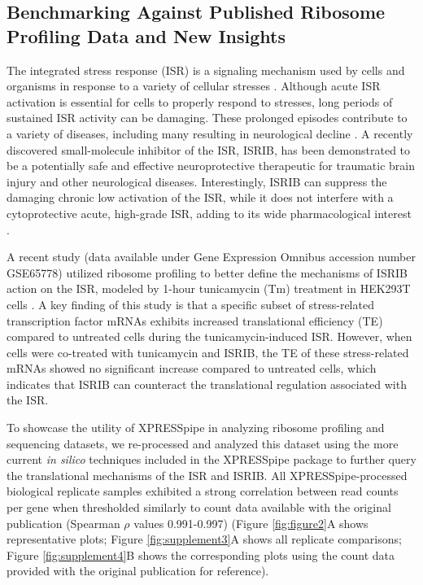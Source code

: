 \documentclass[10pt, oneside]{article}
\begin{document}
\subsection*{Benchmarking Against Published Ribosome Profiling Data and New Insights}
The integrated stress response (ISR) is a signaling mechanism used by cells and organisms in response to a variety of cellular stresses \cite{harding_isr}. Although acute ISR activation is essential for cells to properly respond to stresses, long periods of sustained ISR activity can be damaging. These prolonged episodes contribute to a variety of diseases, including many resulting in neurological decline \cite{isr_disease}. A recently discovered small-molecule inhibitor of the ISR, ISRIB, has been demonstrated to be a potentially safe and effective neuroprotective therapeutic for traumatic brain injury and other neurological diseases. Interestingly, ISRIB can suppress the damaging chronic low activation of the ISR, while it does not interfere with a cytoprotective acute, high-grade ISR, adding to its wide pharmacological interest \cite{isrib_activation, isrib_structure, isrib_riboseq, isrib_neuroprotective, isrib_neuroprotective2, isrib_neuroprotective3, isrib_neuroprotective4}. \par

A recent study (data available under Gene Expression Omnibus accession number GSE65778) utilized ribosome profiling to better define the mechanisms of ISRIB action on the ISR, modeled by 1-hour tunicamycin (Tm) treatment in HEK293T cells \cite{isrib_riboseq}. A key finding of this study is that a specific subset of stress-related transcription factor mRNAs exhibits increased translational efficiency (TE) compared to untreated cells during the tunicamycin-induced ISR. However, when cells were co-treated with tunicamycin and ISRIB, the TE of these stress-related mRNAs showed no significant increase compared to untreated cells, which indicates that ISRIB can counteract the translational regulation associated with the ISR. \par

To showcase the utility of XPRESSpipe in analyzing ribosome profiling and sequencing datasets, we re-processed and analyzed this dataset using the more current \textit{in silico} techniques included in the XPRESSpipe package to further query the translational mechanisms of the ISR and ISRIB. All XPRESSpipe-processed biological replicate samples exhibited a strong correlation between read counts per gene when thresholded similarly to count data available with the original publication (Spearman $\rho$ values 0.991-0.997) (Figure \ref{fig:figure2}A shows representative plots; Figure \ref{fig:supplement3}A shows all replicate comparisons; Figure \ref{fig:supplement4}B shows the corresponding plots using the count data provided with the original publication for reference).\par
\end{document}
